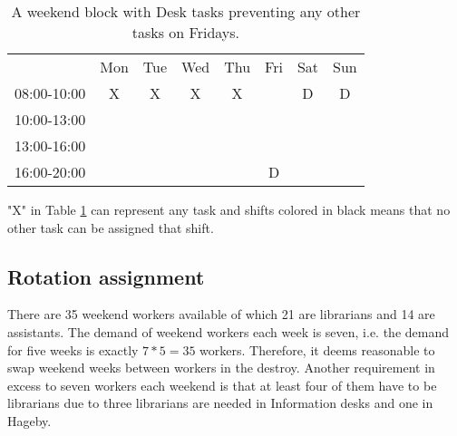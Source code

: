 \begin{table}[!h]
\centering
\caption{A weekend block with Desk tasks preventing any other tasks on Fridays.}
\label{Friday_percolation}
\begin{tabular}{cccccccc}
                                 & Mon                    & Tue                    & Wed                    & Thu                    & Fri                                            & Sat                                            & Sun                                            \\ \cline{2-8} 
\multicolumn{1}{c|}{08:00-10:00} & \multicolumn{1}{c|}{X} & \multicolumn{1}{c|}{X} & \multicolumn{1}{c|}{X} & \multicolumn{1}{c|}{X} & \multicolumn{1}{c|}{\cellcolor[HTML]{000000}}  & \multicolumn{1}{c|}{\cellcolor[HTML]{FCFF2F}D} & \multicolumn{1}{c|}{\cellcolor[HTML]{FCFF2F}D} \\ \cline{2-8} 
\multicolumn{1}{c|}{10:00-13:00} & \multicolumn{1}{c|}{}  & \multicolumn{1}{c|}{}  & \multicolumn{1}{c|}{}  & \multicolumn{1}{c|}{}  & \multicolumn{1}{c|}{\cellcolor[HTML]{000000}}  &                                                &                                                \\ \cline{2-6}
\multicolumn{1}{c|}{13:00-16:00} & \multicolumn{1}{c|}{}  & \multicolumn{1}{c|}{}  & \multicolumn{1}{c|}{}  & \multicolumn{1}{c|}{}  & \multicolumn{1}{c|}{\cellcolor[HTML]{000000}}  &                                                &                                                \\ \cline{2-6}
\multicolumn{1}{c|}{16:00-20:00} & \multicolumn{1}{c|}{}  & \multicolumn{1}{c|}{}  & \multicolumn{1}{c|}{}  & \multicolumn{1}{c|}{}  & \multicolumn{1}{c|}{\cellcolor[HTML]{FCFF2F}D} &                                                &                                                \\ \cline{2-6}
\end{tabular}
\end{table}

 "X" in Table \ref{Friday_percolation} can represent any task and shifts colored in black means that no other task can be assigned that shift.

\subsection{Rotation assignment} \label{rotation}
There are 35 weekend workers available of which 21 are librarians and 14 are assistants. The demand of weekend workers each week is seven, i.e. the demand for five weeks is exactly $7*5 = 35$ workers. Therefore, it deems reasonable to swap weekend weeks between workers in the destroy. Another requirement in excess to seven workers each weekend is that at least four of them have to be librarians due to three librarians are needed in Information desks and one in Hageby.

